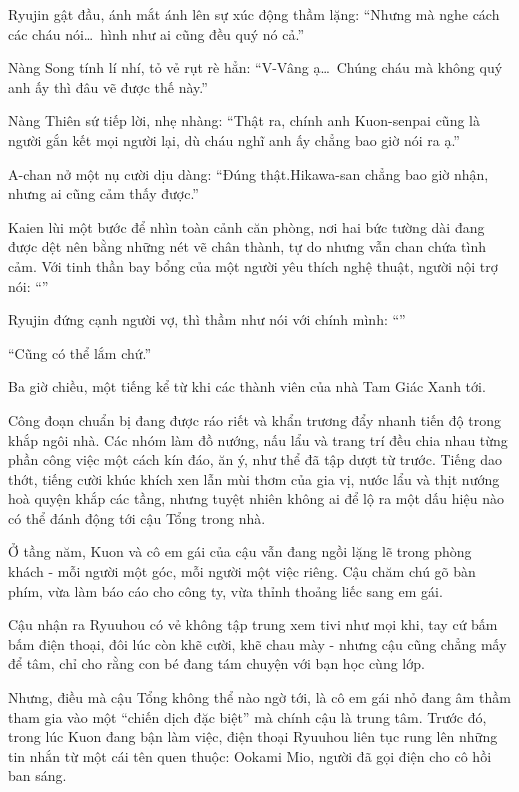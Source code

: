 \documentclass[../main.tex]{subfiles}
\begin{document}
Ryujin gật đầu, ánh mắt ánh lên sự xúc động thầm lặng: ``Nhưng mà nghe cách các cháu nói\dots\ hình như ai cũng đều quý nó cả.''

Nàng Song tính lí nhí, tỏ vẻ rụt rè hẳn: ``V-Vâng ạ\dots\ Chúng cháu mà không quý anh ấy thì đâu vẽ được thế này.''

Nàng Thiên sứ tiếp lời, nhẹ nhàng: ``Thật ra, chính anh Kuon-senpai cũng là người gắn kết mọi người lại, dù cháu nghĩ anh ấy chẳng bao giờ nói ra ạ.''

A-chan nở một nụ cười dịu dàng: ``Đúng thật.Hikawa-san chẳng bao giờ nhận, nhưng ai cũng cảm thấy được.''

Kaien lùi một bước để nhìn toàn cảnh căn phòng, nơi hai bức tường dài đang được dệt nên bằng những nét vẽ chân thành, tự do nhưng vẫn chan chứa tình cảm. Với tinh thần bay bổng của một người yêu thích nghệ thuật, người nội trợ nói: ``''

Ryujin đứng cạnh người vợ, thì thầm như nói với chính mình: ``''

``Cũng có thể lắm chứ.''

\ct

Ba giờ chiều, một tiếng kể từ khi các thành viên của nhà Tam Giác Xanh tới.

Công đoạn chuẩn bị đang được ráo riết và khẩn trương đẩy nhanh tiến độ trong khắp ngôi nhà. Các nhóm làm đồ nướng, nấu lẩu và trang trí đều chia nhau từng phần công việc một cách kín đáo, ăn ý, như thể đã tập dượt từ trước. Tiếng dao thớt, tiếng cười khúc khích xen lẫn mùi thơm của gia vị, nước lẩu và thịt nướng hoà quyện khắp các tầng, nhưng tuyệt nhiên không ai để lộ ra một dấu hiệu nào có thể đánh động tới cậu Tổng trong nhà.

Ở tầng năm, Kuon và cô em gái của cậu vẫn đang ngồi lặng lẽ trong phòng khách - mỗi người một góc, mỗi người một việc riêng. Cậu chăm chú gõ bàn phím, vừa làm báo cáo cho công ty, vừa thỉnh thoảng liếc sang em gái.

Cậu nhận ra Ryuuhou có vẻ không tập trung xem tivi như mọi khi, tay cứ bấm bấm điện thoại, đôi lúc còn khẽ cười, khẽ chau mày - nhưng cậu cũng chẳng mấy để tâm, chỉ cho rằng con bé đang tám chuyện với bạn học cùng lớp.

Nhưng, điều mà cậu Tổng không thể nào ngờ tới, là cô em gái nhỏ đang âm thầm tham gia vào một ``chiến dịch đặc biệt'' mà chính cậu là trung tâm. Trước đó, trong lúc Kuon đang bận làm việc, điện thoại Ryuuhou liên tục rung lên những tin nhắn từ một cái tên quen thuộc: Ookami Mio, người đã gọi điện cho cô hồi ban sáng.
\end{document}
